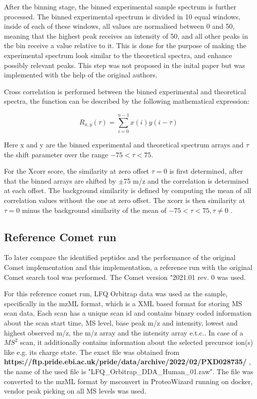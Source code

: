 \documentclass[11pt]{article}
\begin{document}
After the binning stage, the binned experimental sample spectrum is further processed. The binned experimental spectrum is divided in 10 equal windows, inside of each of these windows, all values are normalised between 0 and 50, meaning that the highest peak receives an intensity of 50, and all other peaks in the bin receive a value relative to it. This is done for the purpose of making the experimental spectrum look similar to the theoretical spectra, and enhance possibly relevant peaks. This step was not proposed in the inital paper but was implemented with the help of the original authors.

Cross correlation is performed between the binned experimental and theoretical spectra, the function can be described by the following mathematical expression:

\[R_{x,y}(\tau)=\displaystyle\sum_{i=0}^{n-1}x(i)y(i-\tau)\]

Here x and y are the binned experimental and theoretical spectrum arrays and \(\tau\) the shift parameter over the range \(-75 < \tau < 75\).

For the Xcorr score, the similarity at zero offset \(\tau=0\) is first determined, after that the binned arrays are shifted by $\pm$75 m/z and the correlation is determined at each offset.
The background similarity is defined by computing the mean of all correlation values without the one at zero offset. The xcorr is then similarity at \(\tau=0\) minus the background similarity of the mean of \(-75<\tau<75,\tau\neq0\) \cite{xcorr-function}.

\subsection{Reference Comet run}
To later compare the identified peptides and the performance of the original Comet implementation and this implementation, a reference run with the original Comet search tool was performed. The Comet version "2021.01 rev. 0 was used. 

 For this reference comet run, LFQ Orbitrap data was used as the sample, specifically in the mzML \cite{mzml} format, which is a XML based format for storing MS scan data. Each scan has a unique scan id and contains binary coded information about the scan start time, MS level, base peak m/z and intensity, lowest and highest observed m/z, the m/z array and the intensity array e.t.c.. In case of a \(MS^2\) scan, it additionally contains information about the selected precursor ion(s) like e.g. its charge state. The exact file was obtained from \textbf{https://ftp.pride.ebi.ac.uk/pride/data/archive/2022/02/PXD028735/} , the name of the used file is "LFQ\_Orbitrap\_DDA\_Human\_01.raw". The file was converted to the mzML format by msconvert in ProteoWizard running on docker, vendor peak picking on all MS levels was used.
\end{document}
